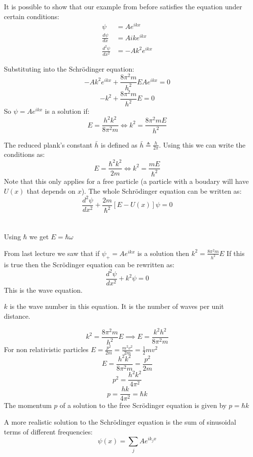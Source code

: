 \documentclass{article}
\newcommand{\dv}[3][]{\frac{d^{#1}{#2}}{d{#3}^{#1}}}
\newcommand{\hb}{\hbar}
\begin{document}
It is possible to show that our example from before satisfies the equation under certain conditions:
\begin{align*}
\psi&=Ae^{ikx}\\
\dv{\psi}{x}&=Aike^{ikx}\\
\dv[2]{\psi}{x}&=-Ak^2e^{ikx}
\end{align*}

Substituting into the Schr\"odinger equation:
\[-Ak^2e^{ikx}+\frac{8\pi^2m}{h^2}EAe^{ikx}=0\]
\[-k^2+\frac{8\pi^2m}{h^2}E=0\]
So \(\psi=Ae^{ikx}\) is a solution if:
\[E=\frac{h^2k^2}{8\pi^2m}\iff k^2=\frac{8\pi^2mE}{h^2}\]

The reduced plank's constant \(\bar h\) is defined as \(\bar h\triangleq\frac{h}{2\pi}\). Using this we can write the conditions as:
\[E=\frac{\hb^2k^2}{2m}\iff k^2=\frac{mE}{\hb^2}\]
Note that this only applies for a free particle (a particle with a boudary will have \(U(x)\) that depends on \(x\)). The whole Schr\"odinger equation can be written as:
\[\dv[2]{\psi}{x}+\frac{2m}{\hb^2}[E-U(x)]\psi=0\]


\section{}

Using \(\hb\) we get \(E=\hb\omega\)

From last lecture we saw that if \(\psi_+=Ae^{ikx}\) is a solution then \(k^2=\frac{8\pi^2m}{h^2}E\) If this is true then the Scr\"odinger equation can be rewritten as:
\[\dv[2]{\psi}{x}+k^2\psi=0\]
This is the wave equation.

\(k\) is the wave number in this equation. It is the number of waves per unit distance.

\[k^2=\frac{8\pi^2m}{h^2}E\implies E=\frac{k^2h^2}{8\pi^2m}\]
For non relativistic particles \(E=\frac{p^2}{2m}=\frac{m^2v^2}{2m}=\frac12mv^2\)
\[E=\frac{h^2k^2}{8\pi^2m}=\frac{p^2}{2m}\]
\[p^2=\frac{h^2k^2}{4\pi^2}\]
\[p=\frac{hk}{4\pi^2}=\hb k\]
The momentum \(p\) of a solution to the free Scr\"odinger equation is given by \(p=\hb k\)

A more realistic solution to the Schr\"odinger equation is the sum of sinusoidal terms of different frequencies:
\[\psi(x)=\sum_jAe^{ik_jx}\]
\end{document}
